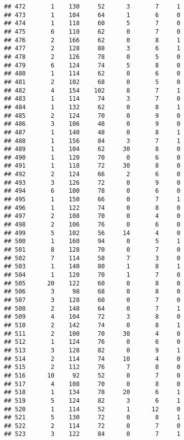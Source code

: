 \documentclass[
]{article}
\begin{document}
\begin{verbatim}
## 472       1    130     52      3       7     1
## 473       1    104     64      1       6     0
## 474       1    118     60      5       7     0
## 475       6    110     62      0       7     0
## 476       2    166     62      0       8     1
## 477       2    128     88      3       6     1
## 478       2    126     78      0       5     0
## 479       6    124     74      5       8     0
## 480       1    114     62      0       6     0
## 481       2    102     68      0       5     0
## 482       4    154    102      8       7     1
## 483       1    114     74      3       7     0
## 484       1    132     62      0       8     1
## 485       2    124     70      0       9     0
## 486       3    106     48      0       9     0
## 487       1    140     48      0       8     1
## 488       1    156     84      3       7     1
## 489       1    104     62     30       8     0
## 490       1    120     70      0       6     0
## 491       1    118     72     30       8     0
## 492       2    124     66      2       6     0
## 493       3    126     72      0       9     0
## 494       6    100     78      0       6     0
## 495       1    150     66      0       7     1
## 496       1    122     74      0       8     0
## 497       2    108     70      0       4     0
## 498       2    106     76      0       6     0
## 499       5    102     56     14       4     0
## 500       1    160     94      0       5     1
## 501       8    128     70      0       7     0
## 502       7    114     58      7       3     0
## 503       1    140     80      1       8     1
## 504       1    120     70      1       7     0
## 505      20    122     60      0       8     0
## 506       3     98     68      0       8     0
## 507       3    128     60      0       7     0
## 508       2    148     64      0       7     1
## 509       4    104     72      3       8     0
## 510       2    142     74      0       8     1
## 511       2    100     70     30       4     0
## 512       1    124     76      0       6     0
## 513       3    128     82      0       9     1
## 514       2    114     74     10       4     0
## 515       2    112     76      7       8     0
## 516      10     92     52      0       7     0
## 517       4    108     70      0       8     0
## 518       1    134     78     20       6     1
## 519       5    124     82      3       6     1
## 520       1    114     52      1      12     0
## 521       5    130     72      0       8     1
## 522       2    114     72      0       7     0
## 523       3    122     84      0       7     1

\end{verbatim}
\end{document}
